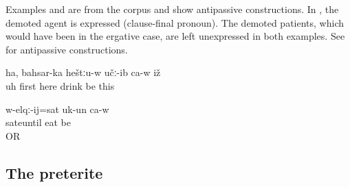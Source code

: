 Examples  and  are from the corpus and show antipassive constructions. In , the demoted agent is expressed (clause-final pronoun). The demoted patients, which would have been in the ergative case, are left unexpressed in both examples. See  for antipassive constructions.
%
\begin{exe}
	\ex	\label{ex:Uh, first he drank here analytic}
	\gll	ha,	bahsar-ka	heštːu-w	učː-ib	ca-w	iž\\
		uh	first	here	 drink	be	this\\
	\glt	{}

	\ex	\label{ex:He ate until he was full analytic}
	\gll	w-elqː-ij=sat	uk-un	ca-w\\
		sateuntil	eat	be\\
	\glt	{} OR 
\end{exe}



\subsection{The preterite}
\label{ssec:The preterite}


